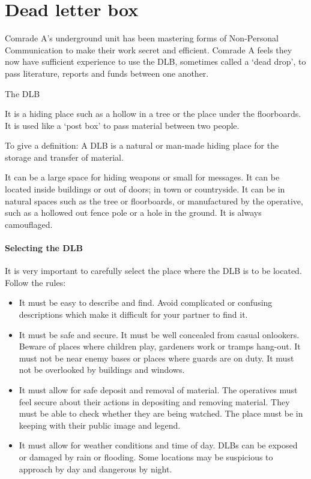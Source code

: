 \section{Dead letter box}

Comrade A's underground unit has been mastering forms of Non-Personal
Communication to make their work secret and efficient. Comrade A feels
they now have sufficient experience to use the DLB, sometimes called a
`dead drop', to pass literature, reports and funds between one another.

{The DLB}

It is a hiding place such as a hollow in a tree or the place under the
floorboards. It is used like a `post box' to pass material between two
people.

To give a definition: A DLB is a natural or man-made hiding place for
the storage and transfer of material.

It can be a large space for hiding weapons or small for messages. It can
be located inside buildings or out of doors; in town or countryside. It
can be in natural spaces such as the tree or floorboards, or
manufactured by the operative, such as a hollowed out fence pole or a
hole in the ground. It is always camouflaged.

\paragraph{Selecting the DLB}

It is very important to carefully select the place where the DLB is to
be located. Follow the rules:

\begin{itemize}
\tightlist
\item
  It must be easy to describe and find. Avoid complicated or confusing
  descriptions which make it difficult for your partner to find it.
\item
  It must be safe and secure. It must be well concealed from casual
  onlookers. Beware of places where children play, gardeners work or
  tramps hang-out. It must not be near enemy bases or places where
  guards are on duty. It must not be overlooked by buildings and
  windows.
\item
  It must allow for safe deposit and removal of material. The operatives
  must feel secure about their actions in depositing and removing
  material. They must be able to check whether they are being watched.
  The place must be in keeping with their public image and legend.
\item
  It must allow for weather conditions and time of day. DLBs can be
  exposed or damaged by rain or flooding. Some locations may be
  suspicious to approach by day and dangerous by night.
\end{itemize}

